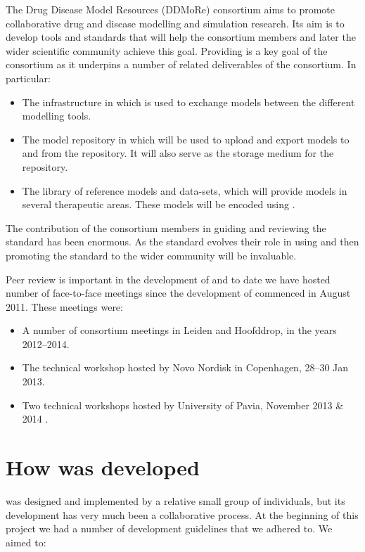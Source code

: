 The Drug Disease Model Resources (DDMoRe) consortium aims to promote collaborative drug and disease
modelling and simulation research. Its aim is to develop tools and standards that will help the
consortium members and later the wider scientific community achieve this goal. Providing \pharmml
is a key goal of the consortium as it underpins a number of related deliverables of the consortium.
In particular:

\begin{itemize}
\item The \ddmore infrastructure in which \pharmml is used to exchange models between the different modelling tools.
\item The \ddmore model repository in which \pharmml will be used to upload and export models to and from the repository. It will also serve as the storage medium for the repository.
\item The \ddmore library of reference models and data-sets, which will provide models in several therapeutic areas. These models will be encoded using \pharmml.
\end{itemize}

The contribution of the \ddmore consortium members in guiding and reviewing the standard has been enormous.
As the standard evolves their role in using and then promoting the standard to the wider community will be invaluable.

Peer review is important in the development of \pharmml and to date we have hosted number of
face-to-face meetings since the development of \pharmml commenced in August 2011. These meetings were:

\begin{itemize}
\item A number of \ddmore consortium meetings in Leiden and Hoofddrop, in the years 2012--2014.
\item The \ddmore technical workshop hosted by Novo Nordisk in Copenhagen, 28--30 Jan 2013.
\item Two \pml technical workshops hosted by University of Pavia, November 2013 \& 2014 .
\end{itemize}

\section{How \pharmml was developed}

\pharmml was designed and implemented by a relative small group of individuals, 
but its development has very much been a collaborative process. At the beginning of 
this project we had a number of development guidelines that we adhered to. We aimed to:

